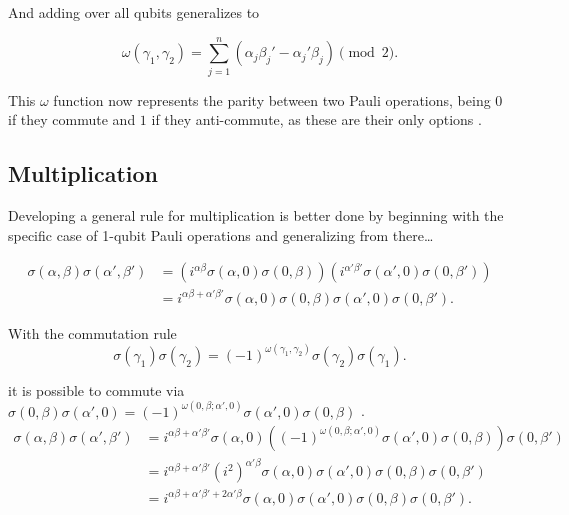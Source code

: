 And adding over all qubits generalizes to

\begin{equation}
  \omega(\gamma_1, \gamma_2) = \sum_{j = 1}^{n} (\alpha_j\beta_j' - \alpha_j'\beta_j) \pmod 2
.\end{equation}

This $\omega$ function now represents the parity between two Pauli operations, being $0$ if they commute and $1$ if they anti-commute, as these are their only options \citep{Kitaev2002}.

\subsection{Multiplication}

Developing a general rule for multiplication is better done by beginning with the specific case of 1-qubit Pauli operations and generalizing from there\dots

\begin{align*}
  \sigma(\alpha, \beta)\sigma(\alpha', \beta') &= \left(i^{\alpha \beta}\sigma(\alpha, 0)\sigma(0, \beta)\right) \left(i^{\alpha' \beta'}\sigma(\alpha', 0)\sigma(0, \beta')\right)\\
  &= i^{\alpha \beta + \alpha'\beta'}\sigma(\alpha, 0)\sigma(0, \beta)\sigma(\alpha', 0)\sigma(0, \beta')
.\end{align*}

With the commutation rule
\begin{equation}
  \sigma(\gamma_1)\sigma(\gamma_2) = (-1)^{\omega(\gamma_1, \gamma_2)}\sigma(\gamma_2)\sigma(\gamma_1)
.\end{equation}

it is possible to commute via $\sigma(0, \beta)\sigma(\alpha', 0) = (-1)^{\omega(0, \beta; \alpha', 0)}\sigma(\alpha', 0)\sigma(0, \beta)$ \citep{Cesar2024}.
\begin{align*}
  \sigma(\alpha, \beta)\sigma(\alpha', \beta') &= i^{\alpha \beta + \alpha'\beta'}\sigma(\alpha, 0)\left((-1)^{\omega(0, \beta; \alpha', 0)}\sigma(\alpha', 0)\sigma(0,\beta)\right)\sigma(0,\beta')\\
  &= i^{\alpha \beta + \alpha'\beta'}(i^{2})^{\alpha'\beta}\sigma(\alpha,0)\sigma(\alpha',0)\sigma(0,\beta)\sigma(0,\beta')\\
  &= i^{\alpha \beta + \alpha'\beta' + 2\alpha'\beta} \sigma(\alpha,0)\sigma(\alpha',0)\sigma(0,\beta)\sigma(0,\beta')
.\end{align*}

